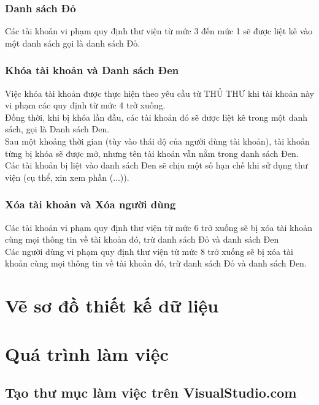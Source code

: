 \documentclass[12pt,a4paper]{report}
\begin{document}
			\subsubsection{Danh sách Đỏ}
			Các tài khoản vi phạm quy định thư viện từ mức 3 đến mức 1 sẽ được liệt kê vào một danh sách gọi là danh sách Đỏ.\\

			\subsubsection{Khóa tài khoản và Danh sách Đen}
			Việc khóa tài khoản được thực hiện theo yêu cầu từ THỦ THƯ khi tài khoản này vi phạm các quy định từ mức 4 trở xuống.\\
			Đồng thời, khi bị khóa lần đầu, các tài khoản đó sẽ được liệt kê trong một danh sách, gọi là Danh sách Đen.\\
			Sau một khoảng thời gian (tùy vào thái độ của người dùng tài khoản), tài khoản từng bị khóa sẽ được mở, nhưng tên tài khoản vẫn nằm trong danh sách Đen.\\
			Các tài khoản bị liệt vào danh sách Đen sẽ chịu một số hạn chế khi sử dụng thư viện (cụ thể, xin xem phần (...)).\\

			\subsubsection{Xóa tài khoản và Xóa người dùng}
			Các tài khoản vi phạm quy định thư viện từ mức 6 trở xuống sẽ bị xóa tài khoản cùng mọi thông tin về tài khoản đó, trừ danh sách Đỏ và danh sách Đen\\
			Các người dùng vi phạm quy định thư viện từ mức 8 trở xuống sẽ bị xóa tài khoản cùng mọi thông tin về tài khoản đó, trừ danh sách Đỏ và danh sách Đen.\\
	\section{Vẽ sơ đồ thiết kế dữ liệu}
	\section{Quá trình làm việc}
		\subsection{Tạo thư mục làm việc trên VisualStudio.com}
\end{document}
